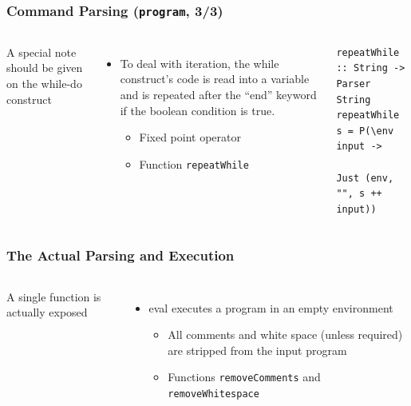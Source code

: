 \documentclass{beamer}
\begin{document}
\begin{frame}[fragile]
	\frametitle{Command Parsing (\texttt{program}, 3/3)}
	\begin{columns}
		\small
		A special note should be given on the while-do construct
		\begin{itemize}
			\small
			\item To deal with iteration, the while construct’s code is read
				into a variable and is repeated after the “end” keyword if the
				boolean condition is true.
			\begin{itemize}
				\footnotesize
				\item Fixed point operator
				\item Function \texttt{repeatWhile}
			\end{itemize}
		\end{itemize}
		
\begin{lstlisting}[basicstyle=\ttfamily\tiny]
repeatWhile :: String -> Parser String
repeatWhile s = P(\env input ->
                  Just (env, "", s ++ input))
\end{lstlisting}
	\end{columns}
\end{frame}


\begin{frame}[fragile]
	\frametitle{The Actual Parsing and Execution}
	\begin{columns}
		\column{0.35\textwidth}
		\small
		A single function is actually exposed
		\begin{itemize}
			\small
		\item eval executes a program in an empty environment
			\begin{itemize}
				\footnotesize
				\item All comments and white space (unless required) are
					stripped from the input program
				\item Functions \texttt{removeComments} and
					\texttt{removeWhitespace}
			\end{itemize}
		\end{itemize}
		\column{0.6\textwidth}
		
	\end{columns}
\end{frame}
\end{document}
